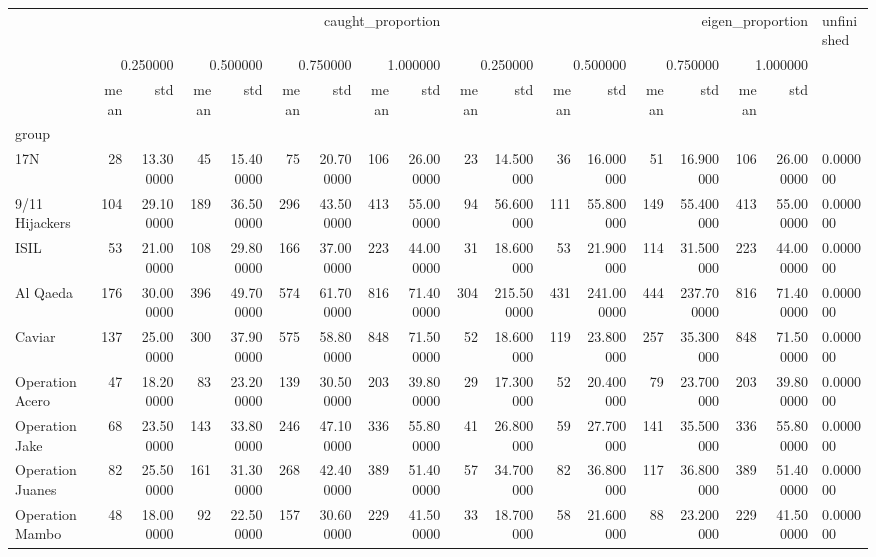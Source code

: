 \begin{tabular}{lrrrrrrrrrrrrrrrrl}
 & \multicolumn{8}{r}{caught_proportion} & \multicolumn{8}{r}{eigen_proportion} & unfinished \\
 & \multicolumn{2}{r}{0.250000} & \multicolumn{2}{r}{0.500000} & \multicolumn{2}{r}{0.750000} & \multicolumn{2}{r}{1.000000} & \multicolumn{2}{r}{0.250000} & \multicolumn{2}{r}{0.500000} & \multicolumn{2}{r}{0.750000} & \multicolumn{2}{r}{1.000000} &  \\
 & mean & std & mean & std & mean & std & mean & std & mean & std & mean & std & mean & std & mean & std &  \\
group &  &  &  &  &  &  &  &  &  &  &  &  &  &  &  &  &  \\
17N & 28 & 13.300000 & 45 & 15.400000 & 75 & 20.700000 & 106 & 26.000000 & 23 & 14.500000 & 36 & 16.000000 & 51 & 16.900000 & 106 & 26.000000 & 0.000000 \\
9/11 Hijackers & 104 & 29.100000 & 189 & 36.500000 & 296 & 43.500000 & 413 & 55.000000 & 94 & 56.600000 & 111 & 55.800000 & 149 & 55.400000 & 413 & 55.000000 & 0.000000 \\
ISIL & 53 & 21.000000 & 108 & 29.800000 & 166 & 37.000000 & 223 & 44.000000 & 31 & 18.600000 & 53 & 21.900000 & 114 & 31.500000 & 223 & 44.000000 & 0.000000 \\
Al Qaeda & 176 & 30.000000 & 396 & 49.700000 & 574 & 61.700000 & 816 & 71.400000 & 304 & 215.500000 & 431 & 241.000000 & 444 & 237.700000 & 816 & 71.400000 & 0.000000 \\
Caviar & 137 & 25.000000 & 300 & 37.900000 & 575 & 58.800000 & 848 & 71.500000 & 52 & 18.600000 & 119 & 23.800000 & 257 & 35.300000 & 848 & 71.500000 & 0.000000 \\
Operation Acero & 47 & 18.200000 & 83 & 23.200000 & 139 & 30.500000 & 203 & 39.800000 & 29 & 17.300000 & 52 & 20.400000 & 79 & 23.700000 & 203 & 39.800000 & 0.000000 \\
Operation Jake & 68 & 23.500000 & 143 & 33.800000 & 246 & 47.100000 & 336 & 55.800000 & 41 & 26.800000 & 59 & 27.700000 & 141 & 35.500000 & 336 & 55.800000 & 0.000000 \\
Operation Juanes & 82 & 25.500000 & 161 & 31.300000 & 268 & 42.400000 & 389 & 51.400000 & 57 & 34.700000 & 82 & 36.800000 & 117 & 36.800000 & 389 & 51.400000 & 0.000000 \\
Operation Mambo & 48 & 18.000000 & 92 & 22.500000 & 157 & 30.600000 & 229 & 41.500000 & 33 & 18.700000 & 58 & 21.600000 & 88 & 23.200000 & 229 & 41.500000 & 0.000000 \\

\end{tabular}
